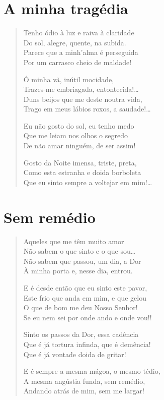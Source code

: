 \chapter{A minha tragédia}

\begin{verse}
Tenho ódio à luz e raiva à claridade\\
Do sol, alegre, quente, na subida.\\
Parece que a minh’alma é perseguida\\
Por um carrasco cheio de maldade!

Ó minha vã, inútil mocidade,\\
Trazes-me embriagada, entontecida!\ldots{}\\
Duns beijos que me deste noutra vida,\\
Trago em meus lábios roxos, a saudade!\ldots{}

Eu não gosto do sol, eu tenho medo\\
Que me leiam nos olhos o segredo\\
De não amar ninguém, de ser assim!

Gosto da Noite imensa, triste, preta,\\
Como esta estranha e doida borboleta\\
Que eu sinto sempre a voltejar em mim!\ldots{}
\end{verse}

\chapter{Sem remédio}

\begin{verse}
Aqueles que me têm muito amor\\
Não sabem o que sinto e o que sou\ldots{}\\
Não sabem que passou, um dia, a Dor\\
À minha porta e, nesse dia, entrou.

E é desde então que eu sinto este pavor,\\
Este frio que anda em mim, e que gelou\\
O que de bom me deu Nosso Senhor!\\
Se eu nem sei por onde ando e onde vou!!

Sinto os passos da Dor, essa cadência\\
Que é já tortura infinda, que é demência!\\
Que é já vontade doida de gritar!

E é sempre a mesma mágoa, o mesmo tédio,\\
A mesma angústia funda, sem remédio,\\
Andando atrás de mim, sem me largar!
\end{verse}

